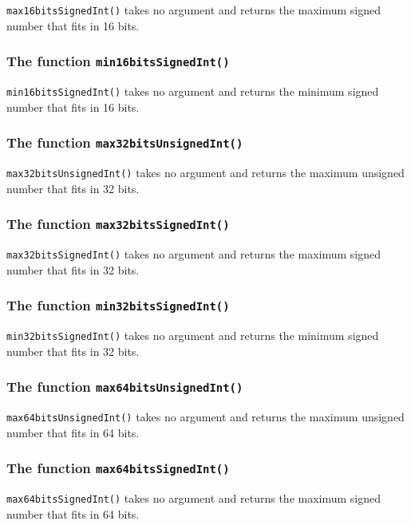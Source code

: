 \documentclass[10pt,openright,twosides]{report}
\newcommand{\gtlinline}[1]{\colorbox{light-blue}{\lstinline[language=gtl]{#1}}}
\begin{document}
\gtlinline{max16bitsSignedInt()} takes no argument and returns the maximum signed number that fits in 16 bits.

\subsubsection{The function \texttt{min16bitsSignedInt()}}

\gtlinline{min16bitsSignedInt()} takes no argument and returns the minimum signed number that fits in 16 bits.

\subsubsection{The function \texttt{max32bitsUnsignedInt()}}

\gtlinline{max32bitsUnsignedInt()} takes no argument and returns the maximum unsigned number that fits in 32 bits.

\subsubsection{The function \texttt{max32bitsSignedInt()}}

\gtlinline{max32bitsSignedInt()} takes no argument and returns the maximum signed number that fits in 32 bits.

\subsubsection{The function \texttt{min32bitsSignedInt()}}

\gtlinline{min32bitsSignedInt()} takes no argument and returns the minimum signed number that fits in 32 bits.

\subsubsection{The function \texttt{max64bitsUnsignedInt()}}

\gtlinline{max64bitsUnsignedInt()} takes no argument and returns the maximum unsigned number that fits in 64 bits.

\subsubsection{The function \texttt{max64bitsSignedInt()}}

\gtlinline{max64bitsSignedInt()} takes no argument and returns the maximum signed number that fits in 64 bits.
\end{document}
